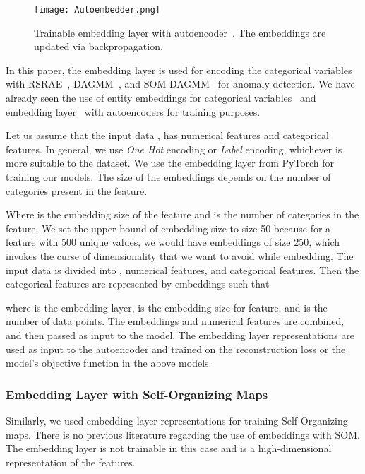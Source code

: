 \documentclass{article}
\begin{document}
\begin{figure}[b]
  \centering
    \texttt{[image: Autoembedder.png]}
    \caption{Trainable embedding layer with autoencoder~\citep{autoembedder}. The embeddings are updated via backpropagation.}
    \label{fig:4.0}
\end{figure}

In this paper, the embedding layer is used for encoding the categorical variables with RSRAE~\citep{rsrae}, DAGMM~\citep{dagmm}, and SOM-DAGMM~\citep{som} for anomaly detection. We have already seen the use of entity embeddings for categorical variables~\citep{entityembed} and embedding layer~\citep{autoembedder} with autoencoders for training purposes. 


Let us assume that the input data , has  numerical features and  categorical features. In general, we use \textit{One Hot} encoding or \textit{Label} encoding, whichever is more suitable to the dataset. We use the embedding layer from PyTorch for training our models. The size of the embeddings depends on the number of categories present in the feature.



Where  is the embedding size of the feature and  is the number of categories in the feature. We set the upper bound of embedding size to size 50 because for a feature with 500 unique values, we would have embeddings of size 250, which invokes the curse of dimensionality that we want to avoid while embedding. The input data is divided into , numerical features, and  categorical features. Then the categorical features are represented by embeddings  such that



where  is the embedding layer,  is the embedding size for  feature, and  is the number of data points. The embeddings  and numerical features are combined,  and then passed as input to the model. The embedding layer representations are used as input to the autoencoder and trained on the reconstruction loss or the model's objective function in the above models.



\subsubsection{Embedding Layer with Self-Organizing Maps}

Similarly, we used embedding layer representations for training Self Organizing maps. There is no previous literature regarding the use of embeddings with SOM. The embedding layer is not trainable in this case and is a high-dimensional representation of the features. 
\end{document}
